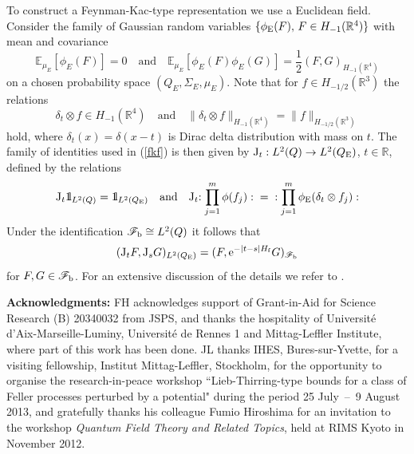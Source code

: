 \documentclass[12pt]{article}
\def\bbbone{{\mathchoice {\rm 1\mskip-4mu l} {\rm 1\mskip-4mu l}
{\rm 1\mskip-4.5mu l} {\rm 1\mskip-5mu l}}}
\def\one{\bbbone}
\newcommand{\Ebb}{{\mathbb E}}
\providecommand{\BR}{{\mathbb{R}^3 }}
\providecommand{\RR}{\mathbb{R}}
\providecommand{\kak}[1]{(\ref{#1})}
\providecommand{\ffff}{{\mathscr{F}_{\rm b}}}
\providecommand{\hf}{H_{\rm f}}
\providecommand{\JJ}{{\rm J}}
\providecommand{\half}{\frac{1}{2}}
\providecommand{\e}{{\rm e}}
\providecommand{\1}{\mathbb{1}}
\begin{document}
To construct a Feynman-Kac-type representation we use a Euclidean field. Consider the family of Gaussian random
variables $\{\phi_{\rm E}(F), \, F\in H_{-1}(\RR^4)\}$ with mean and covariance
$$
\Ebb_{\mu_E}[\phi_E(F)]=0 \quad \mbox{and} \quad \Ebb_{\mu_E}[\phi_E(F)\phi_E(G)]=\half (F, G)_{H_{-1}(\RR^4)}
$$
on a chosen probability space $(Q_E, \Sigma_E, \mu_E)$. Note that for $f\in H_{-1/2}(\BR)$ the relations
$$
\delta_t\otimes f\in H_{-1}(\RR^4) \quad  \mbox{and} \quad \|\delta_t\otimes f\|_{H_{-1}(\RR^4)} =
\|f\|_{H_{-1/2}(\BR)}
$$
hold, where $\delta_t(x) = \delta(x-t)$ is Dirac delta distribution with mass on $t$. The family of identities
used in \kak{fkf}
is  then given by $\JJ_t: L^2(Q)\to L^2(Q_{\rm E})$, $t\in\RR$, defined by the relations
$$
\JJ_t \one_{L^2(Q)}=\one_{L^2(Q_{\rm E})} \quad \mbox{and} \quad
\JJ_t {:\prod_{j=1}^m \phi(f_j):} \;=\; {:\prod_{j=1}^m \phi_{\rm E}(\delta_t\otimes f_j):}
$$
Under the identification
$\ffff \cong L^2(Q)$ it follows that
$$(\JJ_t F, \JJ_s G)_{L^2(Q_{\rm E})}=
(F, \e^{-|t-s|\hf }G)_\ffff $$ for $F, G\in\ffff $. For an extensive discussion of the details we refer to
\cite[Chapter 5]{lhb11}.


\bigskip
\noindent
{\bf Acknowledgments:}
FH acknowledges support of Grant-in-Aid for Science Research (B) 20340032 from JSPS, and thanks the 
hospitality of Universit\'e d'Aix-Marseille-Luminy, Universit\'e de Rennes 1 and Mittag-Leffler 
Institute, where part of this work has been  done. JL thanks IHES, Bures-sur-Yvette, for a visiting 
fellowship, Institut Mittag-Leffler, Stockholm, for the opportunity to organise the research-in-peace 
workshop ``Lieb-Thirring-type bounds for a class of Feller processes perturbed by a potential" during 
the period 25 July~--~9 August 2013, and gratefully thanks his colleague Fumio Hiroshima for an 
invitation to the workshop \emph{Quantum Field Theory and Related Topics}, held at RIMS Kyoto in November 
2012.
\end{document}
